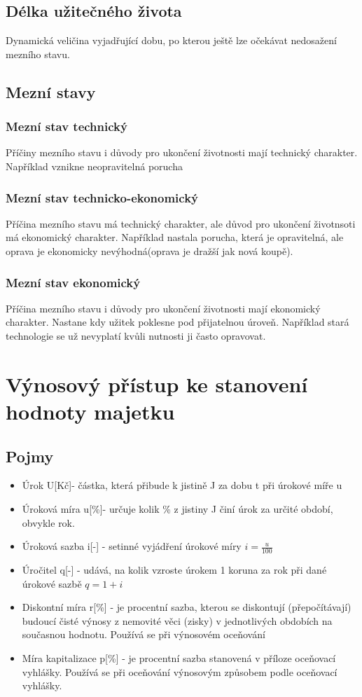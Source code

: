 \subsection{Délka užitečného života}
Dynamická veličina vyjadřující dobu, po kterou ještě lze očekávat nedosažení mezního stavu.

\subsection{Mezní stavy}
\subsubsection*{Mezní stav technický}
Příčiny mezního stavu i důvody pro ukončení životnosti mají technický charakter. Například vznikne neopravitelná porucha
\subsubsection*{Mezní stav technicko-ekonomický}
Příčina mezního stavu má technický charakter, ale důvod pro ukončení životnsoti má ekonomický charakter. Například nastala porucha, která je opravitelná,
ale oprava je ekonomicky nevýhodná(oprava je dražší jak nová koupě).
\subsubsection*{Mezní stav ekonomický}
Příčina mezního stavu i důvody pro ukončení životnosti mají ekonomický charakter. Nastane kdy užitek poklesne pod přijatelnou úroveň. Například stará technologie
se už nevyplatí kvůli nutnosti ji často opravovat.

\section{Výnosový přístup ke stanovení hodnoty majetku}
\subsection{Pojmy}
\begin{itemize}
    \item Úrok U[Kč]- částka, která přibude k jistině J za dobu t při úrokové míře u
    \item Úroková míra u[\%]- určuje kolik \% z jistiny J činí úrok za určité období, obvykle rok.
    \item Úroková sazba i[-] - setinné vyjádření úrokové míry \( i = \frac{u}{100}\)
    \item Úročitel q[-] - udává, na kolik vzroste úrokem 1 koruna za rok při dané úrokové sazbě \( q = 1 + i\)
    \item Diskontní míra r[\%] - je procentní sazba, kterou se diskontují (přepočítávají) budoucí čisté výnosy z nemovité věci (zisky) v jednotlivých obdobích na
    současnou hodnotu. Používá se při výnosovém oceňování
    \item Míra kapitalizace p[\%] - je procentní sazba stanovená v příloze oceňovací vyhlášky. Používá se při oceňování výnosovým způsobem podle oceňovací
    vyhlášky. 
\end{itemize}
